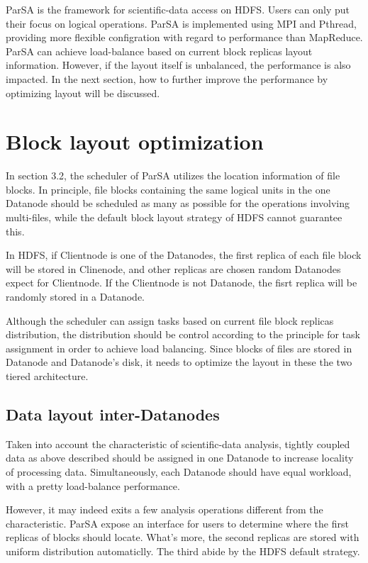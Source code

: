 \documentclass[preprint,12pt]{elsarticle}
\begin{document}
ParSA is the framework for scientific-data access on HDFS. Users can only put their focus on logical operations. ParSA is implemented 
using MPI and Pthread, providing more flexible configration with regard to performance than MapReduce. ParSA can achieve load-balance based
on current block replicas layout information. However, if the layout itself is unbalanced, the performance is also impacted. In the next 
section, how to further improve the performance by optimizing layout will be discussed.

\section{Block layout optimization}
In section 3.2, the scheduler of ParSA utilizes the location information of file blocks. In principle, file blocks containing the same
logical units in the one Datanode should be scheduled as many as possible for the operations involving multi-files, while the default
block layout strategy of HDFS cannot guarantee this. \par
In HDFS, if Clientnode is one of the Datanodes, the first replica of each file block will be stored in Clinenode, and other replicas are 
chosen random Datanodes expect for Clientnode. If the Clientnode is not Datanode, the fisrt replica will be randomly stored in a 
Datanode. \par
Although the scheduler can assign tasks based on current file block replicas distribution, the distribution should be control according 
to the principle for task assignment in order to achieve load balancing. Since blocks of files are stored in Datanode and Datanode's disk,
it needs to optimize the layout in these the two tiered architecture. 

\subsection{Data layout inter-Datanodes}
Taken into account the characteristic of scientific-data analysis, tightly coupled data as above described should be assigned in one 
Datanode to increase locality of processing data. Simultaneously, each Datanode should have equal workload, with a pretty load-balance 
performance. \par 
However, it may indeed exits a few analysis operations different from the characteristic. ParSA expose an interface for users to determine
where the first replicas of blocks should locate. What's more, the second replicas are stored with uniform distribution automaticlly.
The third abide by the HDFS default strategy.  
\end{document}
